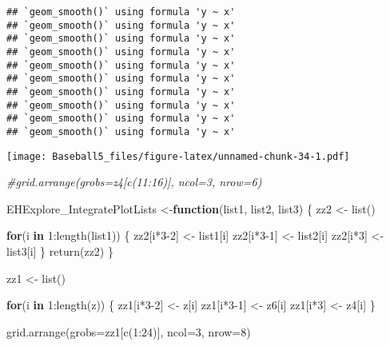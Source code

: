 \documentclass[
]{article}
\newenvironment{Shaded}{\begin{snugshade}}{\end{snugshade}}
\newcommand{\AttributeTok}[1]{\textcolor[rgb]{0.77,0.63,0.00}{#1}}
\newcommand{\CommentTok}[1]{\textcolor[rgb]{0.56,0.35,0.01}{\textit{#1}}}
\newcommand{\ControlFlowTok}[1]{\textcolor[rgb]{0.13,0.29,0.53}{\textbf{#1}}}
\newcommand{\DecValTok}[1]{\textcolor[rgb]{0.00,0.00,0.81}{#1}}
\newcommand{\FunctionTok}[1]{\textcolor[rgb]{0.00,0.00,0.00}{#1}}
\newcommand{\NormalTok}[1]{#1}
\newcommand{\OtherTok}[1]{\textcolor[rgb]{0.56,0.35,0.01}{#1}}
\newcommand{\SpecialCharTok}[1]{\textcolor[rgb]{0.00,0.00,0.00}{#1}}
\begin{document}
\begin{verbatim}
## `geom_smooth()` using formula 'y ~ x'
## `geom_smooth()` using formula 'y ~ x'
## `geom_smooth()` using formula 'y ~ x'
## `geom_smooth()` using formula 'y ~ x'
## `geom_smooth()` using formula 'y ~ x'
## `geom_smooth()` using formula 'y ~ x'
## `geom_smooth()` using formula 'y ~ x'
## `geom_smooth()` using formula 'y ~ x'
## `geom_smooth()` using formula 'y ~ x'
## `geom_smooth()` using formula 'y ~ x'
\end{verbatim}

\texttt{[image: Baseball5\_files/figure-latex/unnamed-chunk-34-1.pdf]}

\begin{Shaded}
\begin{Highlighting}[]
\CommentTok{\#grid.arrange(grobs=z4[c(11:16)],  ncol=3, nrow=6)}
\end{Highlighting}
\end{Shaded}

\begin{Shaded}
\begin{Highlighting}[]
\NormalTok{EHExplore\_IntegratePlotLists }\OtherTok{\textless{}{-}}\ControlFlowTok{function}\NormalTok{(list1, list2, list3)}
\NormalTok{\{  }
\NormalTok{zz2 }\OtherTok{\textless{}{-}} \FunctionTok{list}\NormalTok{()}

\ControlFlowTok{for}\NormalTok{(i }\ControlFlowTok{in} \DecValTok{1}\SpecialCharTok{:}\FunctionTok{length}\NormalTok{(list1)) \{}
\NormalTok{zz2[i}\SpecialCharTok{*}\DecValTok{3{-}2}\NormalTok{] }\OtherTok{\textless{}{-}}\NormalTok{ list1[i]}
\NormalTok{zz2[i}\SpecialCharTok{*}\DecValTok{3{-}1}\NormalTok{] }\OtherTok{\textless{}{-}}\NormalTok{ list2[i]}
\NormalTok{zz2[i}\SpecialCharTok{*}\DecValTok{3}\NormalTok{] }\OtherTok{\textless{}{-}}\NormalTok{ list3[i]}
\NormalTok{\}}
\FunctionTok{return}\NormalTok{(zz2)}
\NormalTok{\}}



\NormalTok{zz1 }\OtherTok{\textless{}{-}} \FunctionTok{list}\NormalTok{()}

\ControlFlowTok{for}\NormalTok{(i }\ControlFlowTok{in} \DecValTok{1}\SpecialCharTok{:}\FunctionTok{length}\NormalTok{(z)) \{}
\NormalTok{zz1[i}\SpecialCharTok{*}\DecValTok{3{-}2}\NormalTok{] }\OtherTok{\textless{}{-}}\NormalTok{ z[i]}
\NormalTok{zz1[i}\SpecialCharTok{*}\DecValTok{3{-}1}\NormalTok{] }\OtherTok{\textless{}{-}}\NormalTok{ z6[i]}
\NormalTok{zz1[i}\SpecialCharTok{*}\DecValTok{3}\NormalTok{] }\OtherTok{\textless{}{-}}\NormalTok{ z4[i]}
\NormalTok{\}}

\FunctionTok{grid.arrange}\NormalTok{(}\AttributeTok{grobs=}\NormalTok{zz1[}\FunctionTok{c}\NormalTok{(}\DecValTok{1}\SpecialCharTok{:}\DecValTok{24}\NormalTok{)],  }\AttributeTok{ncol=}\DecValTok{3}\NormalTok{, }\AttributeTok{nrow=}\DecValTok{8}\NormalTok{)}
\end{Highlighting}
\end{Shaded}
\end{document}
